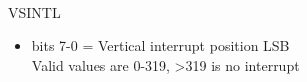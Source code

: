 \\
VSINTL
\begin{itemize}
\item bits 7-0 = Vertical interrupt position LSB\\
  Valid values are 0-319, >319 is no interrupt
\end{itemize}

